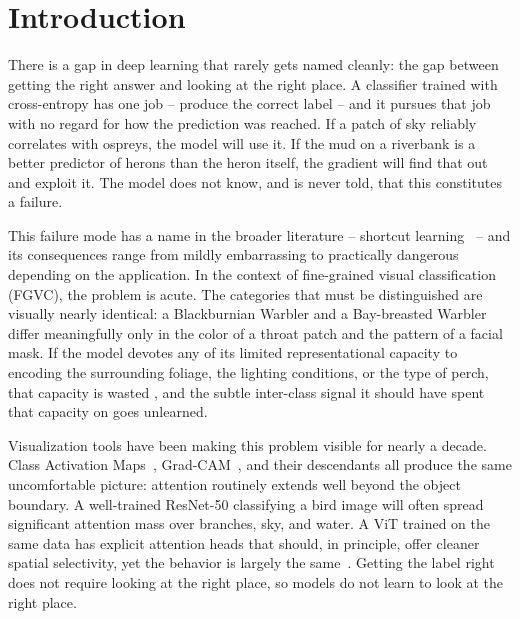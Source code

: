 \documentclass[journal]{IEEEtran}
\begin{document}
\section{Introduction}
\label{sec:intro}

There is a gap in deep learning that rarely gets named cleanly:
the gap between getting the right answer and looking at the right
place. A classifier trained with cross-entropy has one job -- produce
the correct label -- and it pursues that job with no regard for how
the prediction was reached. If a patch of sky reliably correlates
with ospreys, the model will use it. If the mud on a riverbank
is a better predictor of herons than the heron itself, the
gradient will find that out and exploit it. The model does not
know, and is never told, that this constitutes a failure.

This failure mode has a name in the broader literature --
shortcut learning~\cite{geirhos2020shortcut} -- and its consequences
range from mildly embarrassing to practically dangerous depending
on the application. In the context of fine-grained visual
classification (FGVC), the problem is acute. The categories
that must be distinguished are visually nearly identical: a
Blackburnian Warbler and a Bay-breasted Warbler differ meaningfully
only in the color of a throat patch and the pattern of a
facial mask. If the model devotes any of its limited
representational capacity to encoding the surrounding foliage,
the lighting conditions, or the type of perch, that capacity
is wasted , and the subtle inter-class signal it should have
spent that capacity on goes unlearned.

Visualization tools have been making this problem visible for
nearly a decade. Class Activation Maps~\cite{zhou2016learning},
Grad-CAM~\cite{selvaraju2017gradcam}, and their descendants all
produce the same uncomfortable picture: attention routinely
extends well beyond the object boundary. A well-trained
ResNet-50 classifying a bird image will often spread significant
attention mass over branches, sky, and water. A ViT trained
on the same data has explicit attention heads that should, in
principle, offer cleaner spatial selectivity, yet the behavior
is largely the same~\cite{caron2021emerging}. Getting the label
right does not require looking at the right place, so models
do not learn to look at the right place.
\end{document}
